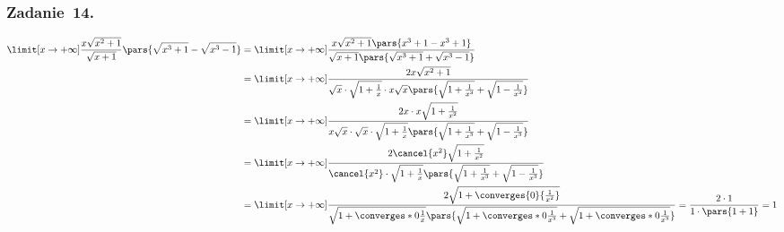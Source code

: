 \subsubsection*{Zadanie~14.}
\begin{equation*}
    \begin{split}
        \limit[x \to +\infty] \frac{x\sqrt{x^2 + 1}}{\sqrt{x + 1}}\pars{\sqrt{x^3 + 1} - \sqrt{x^3 - 1}}
            &= \limit[x \to +\infty] \frac{x\sqrt{x^2 + 1}\pars{x^3 + 1 - x^3 + 1}}{\sqrt{x + 1}\pars{\sqrt{x^3 + 1} + \sqrt{x^3 - 1}}}\\
            &= \limit[x \to +\infty] \frac{2x\sqrt{x^2 + 1}}{\sqrt{x} \cdot \sqrt{1 + \frac{1}{x}} \cdot x\sqrt{x} \pars{\sqrt{1 + \frac{1}{x^3}} + \sqrt{1 - \frac{1}{x^3}}}}\\
            &= \limit[x \to +\infty] \frac{2x \cdot x\sqrt{1 + \frac{1}{x^2}}}{x\sqrt{x} \cdot \sqrt{x} \cdot \sqrt{1 + \frac{1}{x}}\pars{\sqrt{1 + \frac{1}{x^3}} + \sqrt{1 - \frac{1}{x^3}}}}\\
            &= \limit[x \to +\infty] \frac{2\cancel{x^2}\sqrt{1 + \frac{1}{x^2}}}{\cancel{x^2} \cdot \sqrt{1 + \frac{1}{x}}\pars{\sqrt{1 + \frac{1}{x^3}} + \sqrt{1 - \frac{1}{x^3}}}}\\
            &= \limit[x \to +\infty] \frac{2\sqrt{1 + \converges{0}{\frac{1}{x^2}}}}{\sqrt{1 + \converges*{0}{\frac{1}{x}}}\pars{\sqrt{1 + \converges*{0}{\frac{1}{x^3}}} + \sqrt{1 + \converges*{0}{\frac{1}{x^3}}}}}
            = \frac{2 \cdot 1}{1 \cdot \pars{1 + 1}}
            = 1
    \end{split}
\end{equation*}
